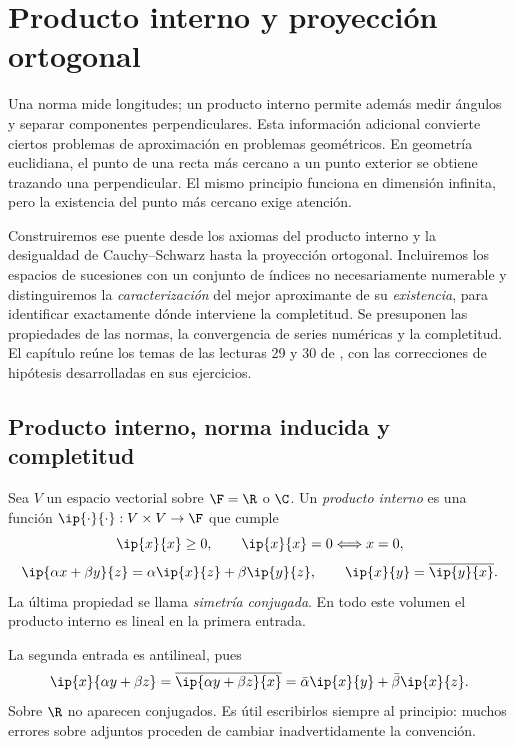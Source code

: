 \chapter{Producto interno y proyección ortogonal}\label{cap:nuevo14}\label{chap:29}\label{chap:30}

Una norma mide longitudes; un producto interno permite además medir ángulos y separar componentes perpendiculares. Esta información adicional convierte ciertos problemas de aproximación en problemas geométricos. En geometría euclidiana, el punto de una recta más cercano a un punto exterior se obtiene trazando una perpendicular. El mismo principio funciona en dimensión infinita, pero la existencia del punto más cercano exige atención.

Construiremos ese puente desde los axiomas del producto interno y la desigualdad de Cauchy--Schwarz hasta la proyección ortogonal. Incluiremos los espacios de sucesiones con un conjunto de índices no necesariamente numerable y distinguiremos la \emph{caracterización} del mejor aproximante de su \emph{existencia}, para identificar exactamente dónde interviene la completitud. Se presuponen las propiedades de las normas, la convergencia de series numéricas y la completitud. El capítulo reúne los temas de las lecturas 29 y 30 de \cite{valencia}, con las correcciones de hipótesis desarrolladas en sus ejercicios.

\section{Producto interno, norma inducida y completitud}
\label{lectura:29}
\begin{definicion}
Sea $V$ un espacio vectorial sobre $\F=\R$ o $\C$. Un \emph{producto interno} es una función $\ip{\cdot}{\cdot}:V\times V\to\F$ que cumple
\[
 \ip{x}{x}\geq0,\qquad \ip{x}{x}=0\Longleftrightarrow x=0,
\]
\[
 \ip{\alpha x+\beta y}{z}=\alpha\ip{x}{z}+\beta\ip{y}{z},
 \qquad \ip{x}{y}=\overline{\ip{y}{x}}.
\]
La última propiedad se llama \emph{simetría conjugada}. En todo este volumen el producto interno es lineal en la primera entrada.
\end{definicion}
La segunda entrada es antilineal, pues
\[
 \ip{x}{\alpha y+\beta z}
 =\overline{\ip{\alpha y+\beta z}{x}}
 =\bar\alpha\ip{x}{y}+\bar\beta\ip{x}{z}.
\]
Sobre $\R$ no aparecen conjugados. Es útil escribirlos siempre al principio: muchos errores sobre adjuntos proceden de cambiar inadvertidamente la convención.

